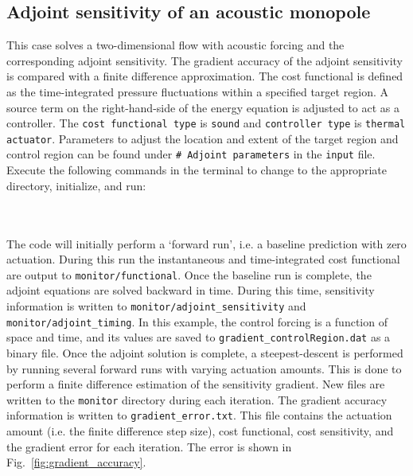 \documentclass[12pt]{article}
\newcommand{\code}[1]{\texttt{#1}}
\begin{document}
\subsection{Adjoint sensitivity of an acoustic monopole}
This case solves a two-dimensional flow with acoustic forcing and the corresponding adjoint sensitivity. The gradient accuracy of the adjoint sensitivity is compared with a finite difference approximation. The cost functional is defined as the time-integrated pressure fluctuations within a specified target region. A source term on the right-hand-side of the energy equation is adjusted to act as a controller. The \code{cost functional type} is \code{sound} and \code{controller type} is \code{thermal actuator}. Parameters to adjust the location and extent of the target region and control region can be found under \code{\# Adjoint parameters} in the \code{input} file. Execute the following commands in the terminal to change to the appropriate directory, initialize, and run:
\\\\
\vspace{1em}
\vspace{.5em}
\\
The code will initially perform a `forward run', i.e. a baseline prediction with zero actuation. During this run the instantaneous and time-integrated cost functional are output to \code{monitor/functional}. Once the baseline run is complete, the adjoint equations are solved backward in time. During this time, sensitivity information is written to \code{monitor/adjoint\_sensitivity} and \code{monitor/adjoint\_timing}. In this example, the control forcing is a function of space and time, and its values are saved to \code{gradient\_controlRegion.dat} as a binary file. Once the adjoint solution is complete, a steepest-descent is performed by running several forward runs with varying actuation amounts. This is done to perform a finite difference estimation of the sensitivity gradient. New files are written to the \code{monitor} directory during each iteration. The gradient accuracy information is written to \code{gradient\_error.txt}. This file contains the actuation amount (i.e. the finite difference step size), cost functional, cost sensitivity, and the gradient error for each iteration. The error is shown in Fig.~\ref{fig:gradient_accuracy}.
\end{document}
